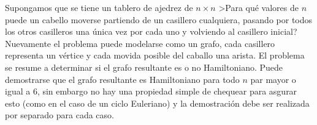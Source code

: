 \begin{ejemplo}
Supongamos que se tiene un tablero de ajedrez de $n\times n$
>Para qué valores de $n$ puede un cabello moverse partiendo de un casillero cualquiera, pasando por todos los otros casilleros una única vez por cada uno y volviendo al casillero inicial?
Nuevamente el problema puede modelarse como un grafo, cada casillero representa un vértice y cada movida posible del caballo una arista. 
El problema se resume a determinar si el grafo resultante es o no Hamiltoniano.
Puede demostrarse que el grafo resultante es Hamiltoniano para todo $n$ par mayor o igual a $6$, sin embargo no hay una propiedad simple de chequear para asgurar esto (como en el caso de un ciclo Euleriano) y la demostración debe ser realizada por separado para cada caso.
\end{ejemplo}
